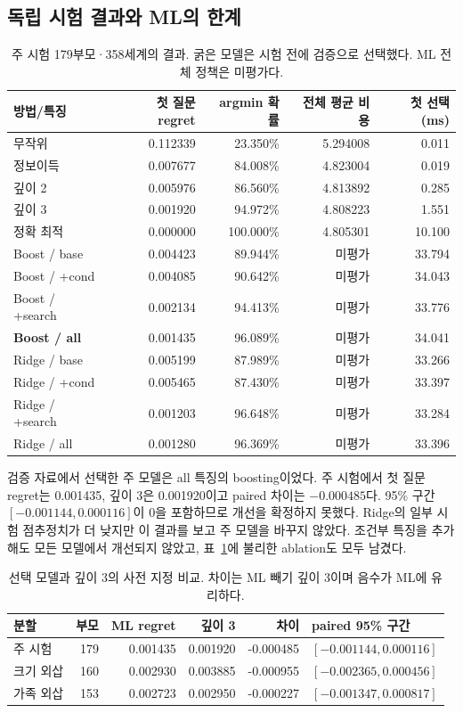 \documentclass[11pt,a4paper]{article}
\theoremstyle{definition}
\theoremstyle{remark}\newtheorem{remark}[theorem]{주석}
\begin{document}
\subsection{독립 시험 결과와 ML의 한계}
\begin{table}[htbp]
\centering\small
\caption{주 시험 179부모·358세계의 결과. 굵은 모델은 시험 전에 검증으로 선택했다. ML 전체 정책은 미평가다.}\label{tab:policy}
\begin{tabular}{lrrrr}\toprule
방법/특징 & 첫 질문 regret & argmin 확률 & 전체 평균 비용 & 첫 선택(ms)\\\midrule
무작위 & 0.112339 & 23.350\% & 5.294008 & 0.011\\
정보이득 & 0.007677 & 84.008\% & 4.823004 & 0.019\\
깊이 2 & 0.005976 & 86.560\% & 4.813892 & 0.285\\
깊이 3 & 0.001920 & 94.972\% & 4.808223 & 1.551\\
정확 최적 & 0.000000 & 100.000\% & 4.805301 & 10.100\\
Boost / base & 0.004423 & 89.944\% & 미평가 & 33.794\\
Boost / +cond & 0.004085 & 90.642\% & 미평가 & 34.043\\
Boost / +search & 0.002134 & 94.413\% & 미평가 & 33.776\\
\textbf{Boost / all} & 0.001435 & 96.089\% & 미평가 & 34.041\\
Ridge / base & 0.005199 & 87.989\% & 미평가 & 33.266\\
Ridge / +cond & 0.005465 & 87.430\% & 미평가 & 33.397\\
Ridge / +search & 0.001203 & 96.648\% & 미평가 & 33.284\\
Ridge / all & 0.001280 & 96.369\% & 미평가 & 33.396\\
\bottomrule\end{tabular}

\end{table}

검증 자료에서 선택한 주 모델은 all 특징의 boosting이었다. 주 시험에서 첫 질문 regret는 0.001435, 깊이 3은 0.001920이고 paired 차이는 $-0.000485$다. 95\% 구간 $[-0.001144,0.000116]$이 0을 포함하므로 개선을 확정하지 못했다. Ridge의 일부 시험 점추정치가 더 낮지만 이 결과를 보고 주 모델을 바꾸지 않았다. 조건부 특징을 추가해도 모든 모델에서 개선되지 않았고, 표~\ref{tab:policy}에 불리한 ablation도 모두 남겼다.

\begin{table}[htbp]
\centering\small
\caption{선택 모델과 깊이 3의 사전 지정 비교. 차이는 ML 빼기 깊이 3이며 음수가 ML에 유리하다.}\label{tab:ood}
\begin{tabular}{lrrrrl}\toprule
분할 & 부모 & ML regret & 깊이 3 & 차이 & paired 95\% 구간\\\midrule
주 시험 & 179 & 0.001435 & 0.001920 & -0.000485 & $[-0.001144,0.000116]$\\
크기 외삽 & 160 & 0.002930 & 0.003885 & -0.000955 & $[-0.002365,0.000456]$\\
가족 외삽 & 153 & 0.002723 & 0.002950 & -0.000227 & $[-0.001347,0.000817]$\\
\bottomrule\end{tabular}

\end{table}
\end{document}
